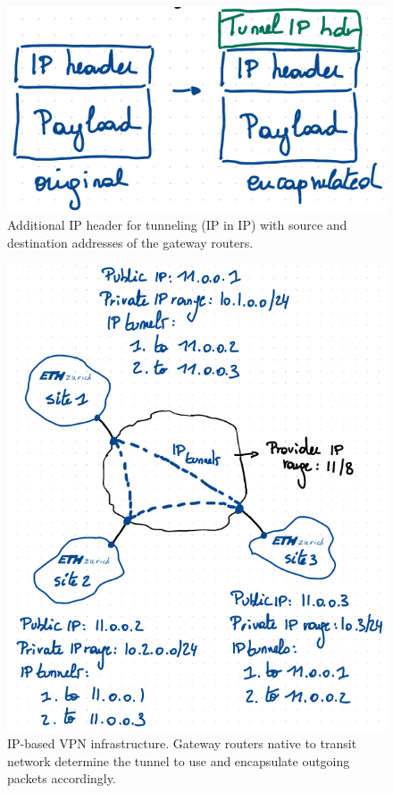\begin{figure}[h]
	\centering
	\includegraphics[scale=0.5]{images/3-tunnel.PNG}
	\caption{Additional IP header for tunneling (IP in IP) with source and destination addresses of the gateway routers.}
	\label{fig:tunnel}
\end{figure}

\begin{figure}[h]
	\centering
	\includegraphics[scale=0.7]{images/3-ipexample.PNG}
	\caption{IP-based VPN infrastructure. Gateway routers native to transit network determine the tunnel to use and encapsulate outgoing packets accordingly.}
	\label{fig:ipexample}
\end{figure}

